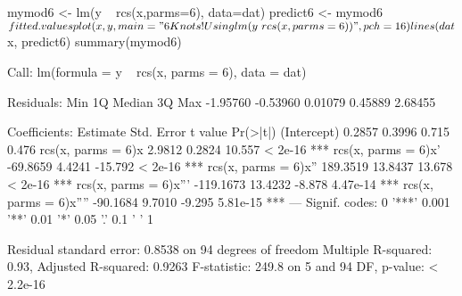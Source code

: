 \begin{Schunk}
\begin{Sinput}
 mymod6 <- lm(y ~ rcs(x,parms=6), data=dat)
 predict6 <- mymod6$fitted.values
 plot(x,y,main="6 Knots! Using lm(y~rcs(x,parms=6))", pch=16)
 lines(dat$x, predict6)
 summary(mymod6)
\end{Sinput}
\begin{Soutput}
Call:
lm(formula = y ~ rcs(x, parms = 6), data = dat)

Residuals:
     Min       1Q   Median       3Q      Max 
-1.95760 -0.53960  0.01079  0.45889  2.68455 

Coefficients:
                        Estimate Std. Error t value Pr(>|t|)    
(Intercept)               0.2857     0.3996   0.715    0.476    
rcs(x, parms = 6)x        2.9812     0.2824  10.557  < 2e-16 ***
rcs(x, parms = 6)x'     -69.8659     4.4241 -15.792  < 2e-16 ***
rcs(x, parms = 6)x''    189.3519    13.8437  13.678  < 2e-16 ***
rcs(x, parms = 6)x'''  -119.1673    13.4232  -8.878 4.47e-14 ***
rcs(x, parms = 6)x''''  -90.1684     9.7010  -9.295 5.81e-15 ***
---
Signif. codes:  0 '***' 0.001 '**' 0.01 '*' 0.05 '.' 0.1 ' ' 1

Residual standard error: 0.8538 on 94 degrees of freedom
Multiple R-squared:   0.93,	Adjusted R-squared:  0.9263 
F-statistic: 249.8 on 5 and 94 DF,  p-value: < 2.2e-16
\end{Soutput}
\end{Schunk}
